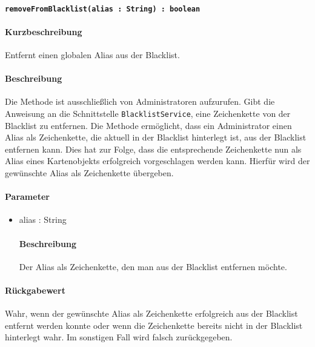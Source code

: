 \paragraph*{\texttt{removeFromBlacklist(alias : String) : boolean}}%
\paragraph*{Kurzbeschreibung}
Entfernt einen globalen Alias aus der Blacklist.
\paragraph*{Beschreibung}
Die Methode ist ausschließlich von Administratoren aufzurufen.
Gibt die Anweisung an die Schnittstelle \texttt{BlacklistService}, eine Zeichenkette von der Blacklist zu entfernen.
Die Methode ermöglicht, dass ein Administrator einen Alias als Zeichenkette, die aktuell in der Blacklist hinterlegt ist, aus der Blacklist entfernen kann.
Dies hat zur Folge, dass die entsprechende Zeichenkette nun als Alias eines Kartenobjekts erfolgreich vorgeschlagen werden kann.
Hierfür wird der gewünschte Alias als Zeichenkette übergeben.
\paragraph*{Parameter}
\begin{itemize}
    \item alias : String
    		\paragraph*{Beschreibung}
    		Der Alias als Zeichenkette, den man aus der Blacklist entfernen möchte.
\end{itemize}
\paragraph*{Rückgabewert}
Wahr, wenn der gewünschte Alias als Zeichenkette erfolgreich aus der Blacklist entfernt werden konnte oder wenn die Zeichenkette bereits nicht in der Blacklist hinterlegt wahr. Im sonstigen Fall wird falsch zurückgegeben.
